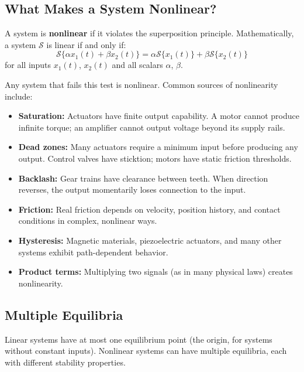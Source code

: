 \subsection{What Makes a System Nonlinear?}

A system is \textbf{nonlinear} if it violates the superposition principle. Mathematically, a system $\mathcal{S}$ is linear if and only if:
\begin{equation}
\mathcal{S}\{\alpha x_1(t) + \beta x_2(t)\} = \alpha \mathcal{S}\{x_1(t)\} + \beta \mathcal{S}\{x_2(t)\}
\label{eq:superposition}
\end{equation}
for all inputs $x_1(t)$, $x_2(t)$ and all scalars $\alpha$, $\beta$.

Any system that fails this test is nonlinear. Common sources of nonlinearity include:

\begin{itemize}
    \item \textbf{Saturation:} Actuators have finite output capability. A motor cannot produce infinite torque; an amplifier cannot output voltage beyond its supply rails.

    \item \textbf{Dead zones:} Many actuators require a minimum input before producing any output. Control valves have sticktion; motors have static friction thresholds.

    \item \textbf{Backlash:} Gear trains have clearance between teeth. When direction reverses, the output momentarily loses connection to the input.

    \item \textbf{Friction:} Real friction depends on velocity, position history, and contact conditions in complex, nonlinear ways.

    \item \textbf{Hysteresis:} Magnetic materials, piezoelectric actuators, and many other systems exhibit path-dependent behavior.

    \item \textbf{Product terms:} Multiplying two signals (as in many physical laws) creates nonlinearity.
\end{itemize}

\subsection{Multiple Equilibria}

Linear systems have at most one equilibrium point (the origin, for systems without constant inputs). Nonlinear systems can have multiple equilibria, each with different stability properties.

